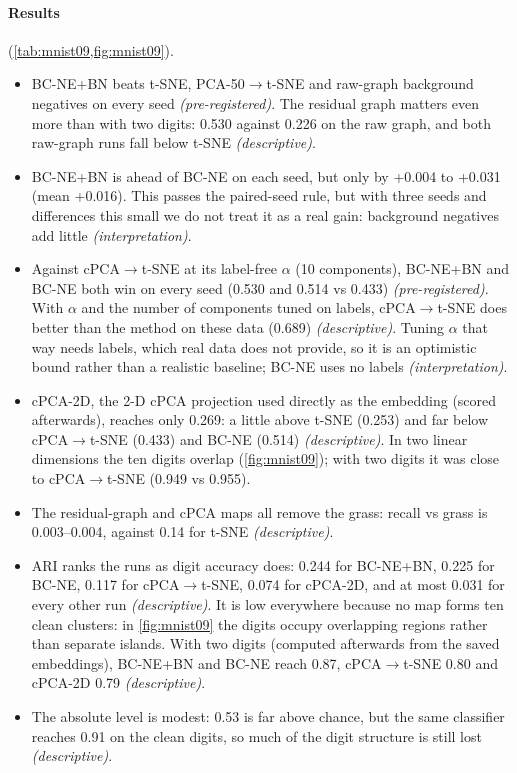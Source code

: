 \documentclass[10pt]{article}
\newcommand{\methodname}{BC-NE}
\newcommand{\BN}{\methodname{}+BN}
\newcommand{\cpre}{\textit{\small (pre-registered)}}
\newcommand{\cdesc}{\textit{\small (descriptive)}}
\newcommand{\cinterp}{\textit{\small (interpretation)}}
\begin{document}
\paragraph{Results} (\cref{tab:mnist09,fig:mnist09}).
\begin{itemize}
  \item \BN{} beats t-SNE, PCA-50$\to$t-SNE and raw-graph background negatives on every seed \cpre. The residual graph matters even more than with two digits: 0.530 against 0.226 on the raw graph, and both raw-graph runs fall below t-SNE \cdesc.
  \item \BN{} is ahead of \methodname{} on each seed, but only by +0.004 to +0.031 (mean +0.016). This passes the paired-seed rule, but with three seeds and differences this small we do not treat it as a real gain: background negatives add little \cinterp.
  \item Against cPCA$\to$t-SNE at its label-free $\alpha$ (10 components), \BN{} and \methodname{} both win on every seed (0.530 and 0.514 vs 0.433) \cpre. With $\alpha$ and the number of components tuned on labels, cPCA$\to$t-SNE does better than the method on these data (0.689) \cdesc. Tuning $\alpha$ that way needs labels, which real data does not provide, so it is an optimistic bound rather than a realistic baseline; \methodname{} uses no labels \cinterp.
  \item cPCA-2D, the 2-D cPCA projection used directly as the embedding (scored afterwards), reaches only 0.269: a little above t-SNE (0.253) and far below cPCA$\to$t-SNE (0.433) and \methodname{} (0.514) \cdesc. In two linear dimensions the ten digits overlap (\cref{fig:mnist09}); with two digits it was close to cPCA$\to$t-SNE (0.949 vs 0.955).
  \item The residual-graph and cPCA maps all remove the grass: recall vs grass is 0.003--0.004, against 0.14 for t-SNE \cdesc.
  \item ARI ranks the runs as digit accuracy does: 0.244 for \BN{}, 0.225 for \methodname{}, 0.117 for cPCA$\to$t-SNE, 0.074 for cPCA-2D, and at most 0.031 for every other run \cdesc. It is low everywhere because no map forms ten clean clusters: in \cref{fig:mnist09} the digits occupy overlapping regions rather than separate islands. With two digits (computed afterwards from the saved embeddings), \BN{} and \methodname{} reach 0.87, cPCA$\to$t-SNE 0.80 and cPCA-2D 0.79 \cdesc.
  \item The absolute level is modest: 0.53 is far above chance, but the same classifier reaches 0.91 on the clean digits, so much of the digit structure is still lost \cdesc.
\end{itemize}
\end{document}
